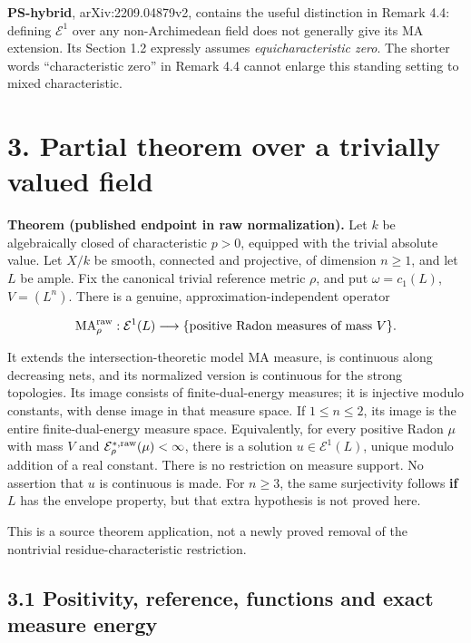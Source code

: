 \documentclass[
  11pt,
]{article}
\begin{document}
\textbf{PS-hybrid}, arXiv:2209.04879v2, contains the useful distinction
in Remark 4.4: defining \(\mathcal E^1\) over any non-Archimedean field
does not generally give its MA extension. Its Section 1.2 expressly
assumes \emph{equicharacteristic zero}. The shorter words
``characteristic zero'' in Remark 4.4 cannot enlarge this standing
setting to mixed characteristic.

\section{3. Partial theorem over a trivially valued
field}\label{partial-theorem-over-a-trivially-valued-field}

\textbf{Theorem (published endpoint in raw normalization).} Let \(k\) be
algebraically closed of characteristic \(p>0\), equipped with the
trivial absolute value. Let \(X/k\) be smooth, connected and projective,
of dimension \(n\geq1\), and let \(L\) be ample. Fix the canonical
trivial reference metric \(\rho\), and put \(\omega=c_1(L)\),
\(V=(L^n)\). There is a genuine, approximation-independent operator

\[\operatorname{MA}^{\rm raw}_{\rho}:\mathcal E^1(L)\longrightarrow\{\text{positive Radon measures of mass }V\}.\]

It extends the intersection-theoretic model MA measure, is continuous
along decreasing nets, and its normalized version is continuous for the
strong topologies. Its image consists of finite-dual-energy measures; it
is injective modulo constants, with dense image in that measure space.
If \(1\leq n\leq2\), its image is the entire finite-dual-energy measure
space. Equivalently, for every positive Radon \(\mu\) with mass \(V\)
and \(\mathcal E_{\rho}^{*,\rm raw}(\mu)<\infty\), there is a solution
\(u\in\mathcal E^1(L)\), unique modulo addition of a real constant.
There is no restriction on measure support. No assertion that \(u\) is
continuous is made. For \(n\geq3\), the same surjectivity follows
\textbf{if} \(L\) has the envelope property, but that extra hypothesis
is not proved here.

This is a source theorem application, not a newly proved removal of the
nontrivial residue-characteristic restriction.

\subsection{3.1 Positivity, reference, functions and exact measure
energy}\label{positivity-reference-functions-and-exact-measure-energy}
\end{document}
